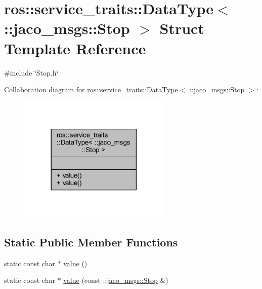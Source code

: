 \hypertarget{structros_1_1service__traits_1_1DataType_3_01_1_1jaco__msgs_1_1Stop_01_4}{}\section{ros\+:\+:service\+\_\+traits\+:\+:Data\+Type$<$ \+:\+:jaco\+\_\+msgs\+:\+:Stop $>$ Struct Template Reference}
\label{structros_1_1service__traits_1_1DataType_3_01_1_1jaco__msgs_1_1Stop_01_4}


{\ttfamily \#include \char`\"{}Stop.\+h\char`\"{}}



Collaboration diagram for ros\+:\+:service\+\_\+traits\+:\+:Data\+Type$<$ \+:\+:jaco\+\_\+msgs\+:\+:Stop $>$\+:
\nopagebreak
\begin{figure}[H]
\begin{center}
\leavevmode
\includegraphics[width=206pt]{d4/d5d/structros_1_1service__traits_1_1DataType_3_01_1_1jaco__msgs_1_1Stop_01_4__coll__graph}
\end{center}
\end{figure}
\subsection*{Static Public Member Functions}
\begin{DoxyCompactItemize}
\item 
static const char $\ast$ \hyperlink{structros_1_1service__traits_1_1DataType_3_01_1_1jaco__msgs_1_1Stop_01_4_a44899679d19363e368845f3c7e2ac852}{value} ()
\item 
static const char $\ast$ \hyperlink{structros_1_1service__traits_1_1DataType_3_01_1_1jaco__msgs_1_1Stop_01_4_a34b6c2b1e4d6e22d3225413b814aeb8b}{value} (const \+::\hyperlink{namespacejaco__msgs_df/d54/structjaco__msgs_1_1Stop}{jaco\+\_\+msgs\+::\+Stop} \&)
\end{DoxyCompactItemize}



